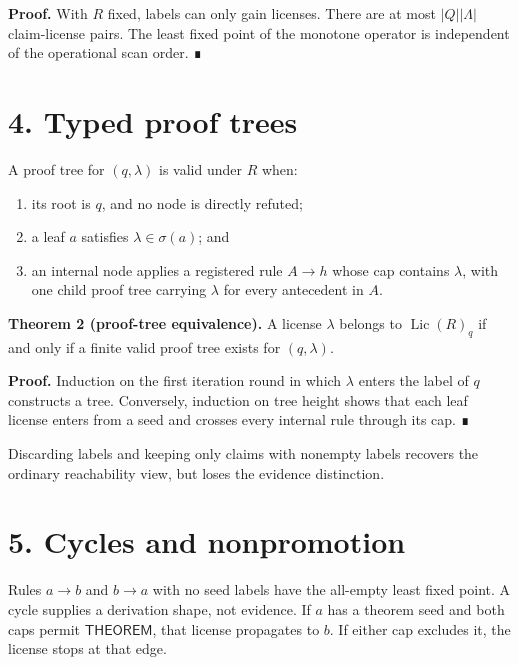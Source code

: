 \documentclass[
  11pt,
]{article}
\providecommand{\tightlist}{%
  \setlength{\itemsep}{0pt}\setlength{\parskip}{0pt}}
\begin{document}
\textbf{Proof.} With \(R\) fixed, labels can only gain licenses. There
are at most \(|Q||\Lambda|\) claim-license pairs. The least fixed point
of the monotone operator is independent of the operational scan order. ∎

\hypertarget{typed-proof-trees}{%
\section{4. Typed proof trees}\label{typed-proof-trees}}

A proof tree for \((q, \lambda)\) is valid under \(R\) when:

\begin{enumerate}
\def\labelenumi{\arabic{enumi}.}
\tightlist
\item
  its root is \(q\), and no node is directly refuted;
\item
  a leaf \(a\) satisfies \(\lambda\in\sigma(a)\); and
\item
  an internal node applies a registered rule \(A\to h\) whose cap
  contains \(\lambda\), with one child proof tree carrying \(\lambda\)
  for every antecedent in \(A\).
\end{enumerate}

\textbf{Theorem 2 (proof-tree equivalence).} A license \(\lambda\)
belongs to \(\operatorname{Lic}(R)_q\) if and only if a finite valid
proof tree exists for \((q, \lambda)\).

\textbf{Proof.} Induction on the first iteration round in which
\(\lambda\) enters the label of \(q\) constructs a tree. Conversely,
induction on tree height shows that each leaf license enters from a seed
and crosses every internal rule through its cap. ∎

Discarding labels and keeping only claims with nonempty labels recovers
the ordinary reachability view, but loses the evidence distinction.

\hypertarget{cycles-and-nonpromotion}{%
\section{5. Cycles and nonpromotion}\label{cycles-and-nonpromotion}}

Rules \(a\to b\) and \(b\to a\) with no seed labels have the all-empty
least fixed point. A cycle supplies a derivation shape, not evidence. If
\(a\) has a theorem seed and both caps permit \(\textsf{THEOREM}\), that
license propagates to \(b\). If either cap excludes it, the license
stops at that edge.
\end{document}
